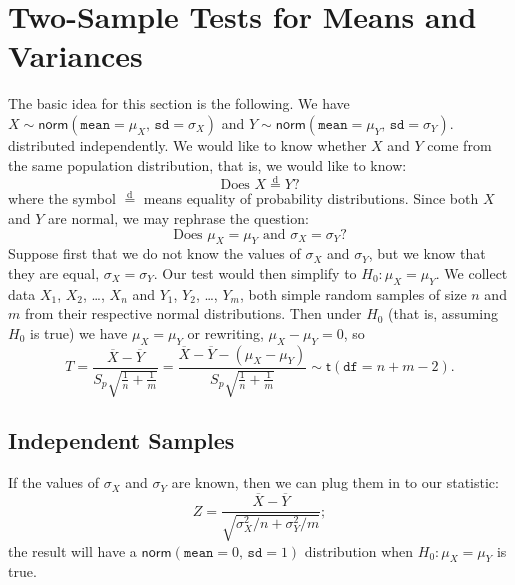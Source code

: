 \documentclass[captions=tableheading]{scrbook}
\begin{document}
\section{Two-Sample Tests for Means and Variances}
\label{sec-10-4}
\label{sec-Two-Sample-Tests-for-Means}


The basic idea for this section is the following. We have \(X\sim\mathsf{norm}(\mathtt{mean}=\mu_{X},\,\mathtt{sd}=\sigma_{X})\) and \(Y\sim\mathsf{norm}(\mathtt{mean}=\mu_{Y},\,\mathtt{sd}=\sigma_{Y})\). distributed independently. We would like to know whether \(X\) and \(Y\) come from the same population distribution, that is, we would like to know:
\begin{equation}
\mbox{Does }X\overset{\mathrm{d}}{=}Y?
\end{equation}
where the symbol \(\overset{\mathrm{d}}{=}\) means equality of probability distributions.
Since both \(X\) and \(Y\) are normal, we may rephrase the question:
\begin{equation}
\mbox{Does }\mu_{X}=\mu_{Y}\mbox{ and }\sigma_{X}=\sigma_{Y}?
\end{equation}
Suppose first that we do not know the values of \(\sigma_{X}\) and \(\sigma_{Y}\), but we know that they are equal, \(\sigma_{X}=\sigma_{Y}\). Our test would then simplify to \(H_{0}:\mu_{X}=\mu_{Y}\). We collect data \(X_{1}\), \(X_{2}\), \ldots{}, \(X_{n}\) and \(Y_{1}\), \(Y_{2}\), \ldots{}, \(Y_{m}\), both simple random samples of size \(n\) and \(m\) from their respective normal distributions. Then under \(H_{0}\) (that is, assuming \(H_{0}\) is true) we have \(\mu_{X}=\mu_{Y}\) or rewriting, \(\mu_{X}-\mu_{Y}=0\), so 
\begin{equation}
T=\frac{\overline{X}-\overline{Y}}{S_{p}\sqrt{\frac{1}{n}+\frac{1}{m}}}=\frac{\overline{X}-\overline{Y}-(\mu_{X}-\mu_{Y})}{S_{p}\sqrt{\frac{1}{n}+\frac{1}{m}}}\sim\mathsf{t}(\mathtt{df}=n+m-2).
\end{equation}
\subsection{Independent Samples}
\label{sec-10-4-1}


\begin{rem}
If the values of \(\sigma_{X}\) and \(\sigma_{Y}\) are known, then we can plug them in to our statistic:
\begin{equation} 
Z=\frac{\overline{X}-\overline{Y}}{\sqrt{\sigma_{X}^{2}/n+\sigma_{Y}^{2}/m}};
\end{equation}
the result will have a \(\mathsf{norm}(\mathtt{mean}=0,\,\mathtt{sd}=1)\) distribution when \(H_{0}:\mu_{X}=\mu_{Y}\) is true. 
\end{rem}
\end{document}
